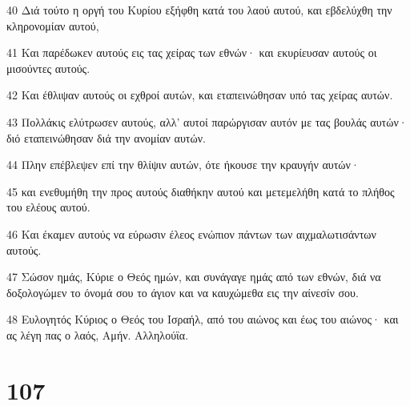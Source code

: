 \par 40 Διά τούτο η οργή του Κυρίου εξήφθη κατά του λαού αυτού, και εβδελύχθη την κληρονομίαν αυτού,
\par 41 Και παρέδωκεν αυτούς εις τας χείρας των εθνών· και εκυρίευσαν αυτούς οι μισούντες αυτούς.
\par 42 Και έθλιψαν αυτούς οι εχθροί αυτών, και εταπεινώθησαν υπό τας χείρας αυτών.
\par 43 Πολλάκις ελύτρωσεν αυτούς, αλλ' αυτοί παρώργισαν αυτόν με τας βουλάς αυτών· διό εταπεινώθησαν διά την ανομίαν αυτών.
\par 44 Πλην επέβλεψεν επί την θλίψιν αυτών, ότε ήκουσε την κραυγήν αυτών·
\par 45 και ενεθυμήθη την προς αυτούς διαθήκην αυτού και μετεμελήθη κατά το πλήθος του ελέους αυτού.
\par 46 Και έκαμεν αυτούς να εύρωσιν έλεος ενώπιον πάντων των αιχμαλωτισάντων αυτούς.
\par 47 Σώσον ημάς, Κύριε ο Θεός ημών, και συνάγαγε ημάς από των εθνών, διά να δοξολογώμεν το όνομά σου το άγιον και να καυχώμεθα εις την αίνεσίν σου.
\par 48 Ευλογητός Κύριος ο Θεός του Ισραήλ, από του αιώνος και έως του αιώνος· και ας λέγη πας ο λαός, Αμήν. Αλληλούϊα.

\chapter{107}


